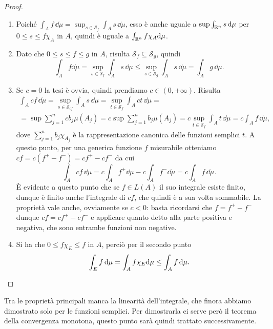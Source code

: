 \begin{proof}
	\begin{enumerate}
		\item Poich\'e $\int_Af\,\dd\mu=\sup_{s\in\mathcal S_f}\int_As\,\dd\mu$, esso è anche uguale a $\sup\int_{\mathbb{R}^n}s\,\textup{d}\mu$ per $0\leq s\leq f\chi_A$ in $A$, quindi è uguale a $\int_{\mathbb{R}^n}f\chi_A\textup{d}\mu$.
		\item Dato che $0\leq s\leq f\leq g$ in $A$, risulta $\mathcal S_f\subseteq\mathcal S_g$, quindi
			\begin{equation}
				\int_Af\dd\mu=\sup_{s\in\mathcal S_f}\int_As\,\dd\mu\leq\sup_{s\in\mathcal S_g}\int_As\,\dd\mu=\int_Ag\,\dd\mu.
			\end{equation}
		\item Se $c=0$ la tesi è ovvia, quindi prendiamo $c\in(0,+\infty)$.
			Risulta
			\begin{multline}
				\int_Acf\,\dd\mu=\sup_{s\in\mathcal S_{cf}}\int_As\,\dd\mu=\sup_{t\in\mathcal S_f}\int_Act\,\dd\mu=\\
				=\sup\sum_{j=1}^ncb_j\mu(A_j)=c\sup\sum_{j=1}^nb_j\mu(A_j)=c\sup_{t\in\mathcal S_f}\int_At\,\dd\mu=c\int_Af\,\dd\mu,
			\end{multline}
			dove $\sum_{j=1}^nb_j\chi_{A_j}$ è la rappresentazione canonica delle funzioni semplici $t$.
			A questo punto, per una generica funzione $f$ misurabile otteniamo $cf=c(f^+-f^-)=cf^+-cf^-$ da cui
			\begin{equation}
				\int_Acf\,\dd\mu=c\int_Af^+\dd\mu-c\int_Af^-\dd\mu=c\int_Af\,\dd\mu.
			\end{equation}
			È evidente a questo punto che se $f\in L(A)$ il suo integrale esiste finito, dunque è finito anche l'integrale di $cf$, che quindi è a sua volta sommabile.
			La proprietà vale anche, ovviamente se $c<0$: basta ricordarsi che $f=f^+-f^-$ dunque $cf=cf^+-cf^-$ e applicare quanto detto alla parte positiva e negativa, che sono entrambe funzioni non negative.
		\item Si ha che $0\leq f\chi_E\leq f$ in $A$, perciò per il secondo punto
			\begin{equation}
				\int_Ef\,\textup{d}\mu=\int_Af\chi_E\textup{d}\mu\leq \int_Af\,\textup{d}\mu.\qedhere
			\end{equation}
	\end{enumerate}
\end{proof}
Tra le proprietà principali manca la linearità dell'integrale, che finora abbiamo dimostrato solo per le funzioni semplici.
Per dimostrarla ci serve però il teorema della convergenza monotona, questo punto sarà quindi trattato successivamente.

